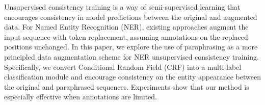 Unsupervised consistency training is a way of semi-supervised learning that encourages consistency in model predictions between the original and augmented data. For Named Entity Recognition (NER), existing approaches augment the input sequence with token replacement, assuming annotations on the replaced positions unchanged. In this paper, we explore the use of paraphrasing as a more principled data augmentation scheme for NER unsupervised consistency training. Specifically, we convert Conditional Random Field (CRF) into a multi-label classification module and encourage consistency on the entity appearance between the original and paraphrased sequences. Experiments show that our method is especially effective when annotations are limited.
